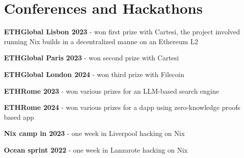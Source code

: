 \documentclass[]{cv}
\begin{document}
\begin{minipage}[t]{0.75\textwidth}
\section{Conferences and Hackathons}
\vspace{+0.5em}
\begin{tightemize}
\item \textbf{ETHGlobal Lisbon 2023} - won first prize with Cartesi, the project involved running Nix builds in a decentralized manne on an Ethereum L2
\item \textbf{ETHGlobal Paris 2023} - won second prize with Cartesi
\item \textbf{ETHGlobal London 2024} - won third prize with Filecoin
\item \textbf{ETHRome 2023} - won various prizes for an LLM-based search engine
\item \textbf{ETHRome 2024} - won various prizes for a dapp using zero-knowledge proofs based app
\item \textbf{Nix camp in 2023} - one week in Liverpool hacking on Nix
\item \textbf{Ocean sprint 2022} - one week in Lanzarote hacking on Nix
\end{tightemize}
\sectionsep

\end{minipage}
\hfill
\end{document}
